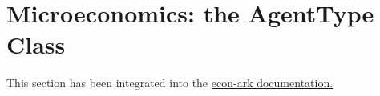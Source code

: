 \documentclass[12pt,titlepage,letterpaper]{econtex}
\begin{document}
{%

\section{Microeconomics: the AgentType Class}\label{sec:Microeconomics}

This section has been integrated into the \href{https://hark.readthedocs.io/en/latest/ARKitecture.html\#agenttype-class}{econ-ark documentation.}

}
\end{document}
